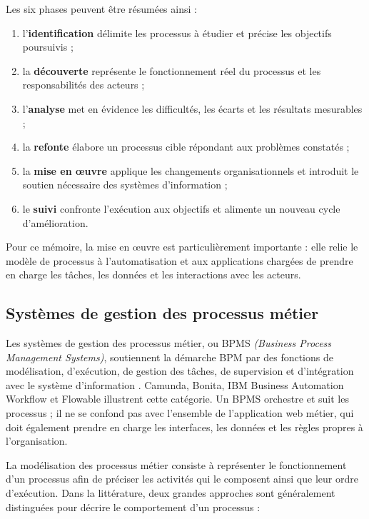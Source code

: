 Les six phases peuvent être résumées ainsi :
\begin{enumerate}
    \item l'\textbf{identification} délimite les processus à étudier et précise
    les objectifs poursuivis ;
    \item la \textbf{découverte} représente le fonctionnement réel du processus
    et les responsabilités des acteurs ;
    \item l'\textbf{analyse} met en évidence les difficultés, les écarts et les
    résultats mesurables ;
    \item la \textbf{refonte} élabore un processus cible répondant aux problèmes
    constatés ;
    \item la \textbf{mise en œuvre} applique les changements organisationnels et
    introduit le soutien nécessaire des systèmes d'information ;
    \item le \textbf{suivi} confronte l'exécution aux objectifs et alimente un
    nouveau cycle d'amélioration.
\end{enumerate}
Pour ce mémoire, la mise en œuvre est particulièrement importante : elle relie
le modèle de processus à l'automatisation et aux applications chargées de prendre
en charge les tâches, les données et les interactions avec les acteurs.

\subsection{Systèmes de gestion des processus métier}

Les systèmes de gestion des processus métier, ou BPMS \textit{(Business Process
Management Systems)}, soutiennent la démarche BPM par des fonctions de
modélisation, d'exécution, de gestion des tâches, de supervision et
d'intégration avec le système d'information \citep{bonitasoftBPMN2}. Camunda,
Bonita, IBM Business Automation Workflow et Flowable illustrent cette catégorie.
Un BPMS orchestre et suit les processus ; il ne se confond pas avec l'ensemble
de l'application web métier, qui doit également prendre en charge les interfaces,
les données et les règles propres à l'organisation.


La modélisation des processus métier consiste à représenter le fonctionnement d'un processus
afin de préciser les activités qui le composent ainsi que leur ordre d'exécution. Dans la
littérature, deux grandes approches sont généralement distinguées pour décrire le comportement
d'un processus \citep{pichler2011imperative} :

